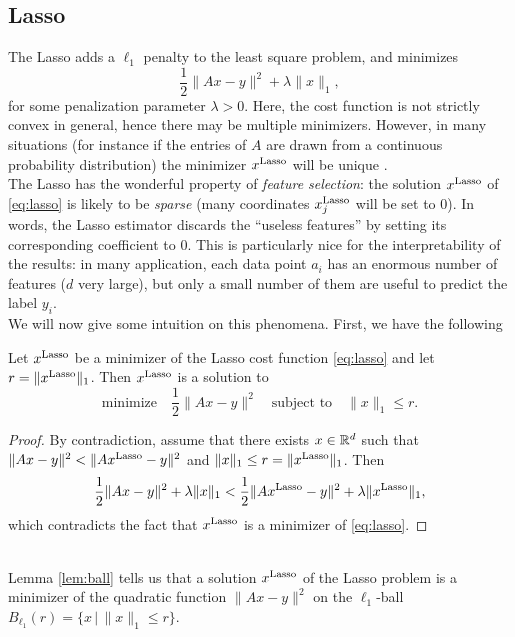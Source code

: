 \documentclass[11pt,nocut]{article}
\begin{document}
\subsection{Lasso}

The Lasso adds a $\ell_1$ penalty to the least square problem, and minimizes
\begin{equation}\label{eq:lasso}
\frac{1}{2} \| Ax - y \|^2 + \lambda \|x\|_1,
\end{equation}
for some penalization parameter $\lambda >0$.
Here, the cost function is not strictly convex in general, hence there may be multiple minimizers. However, in many situations (for instance if the entries of $A$ are drawn from a continuous probability distribution) the minimizer $x^{\rm Lasso}$ will be unique \cite{tibshirani2013lasso}.
\\

The Lasso has the wonderful property of \emph{feature selection}: the solution $x^{\rm Lasso}$ of \eqref{eq:lasso} is likely to be \emph{sparse} (many coordinates $x^{\rm Lasso}_j$ will be set to $0$).
In words, the Lasso estimator discards the ``useless features'' by setting its corresponding coefficient to $0$. 
This is particularly nice for the interpretability of the results: in many application, each data point $a_i$ has an enormous number of features ($d$ very large), but only a small number of them are useful to predict the label $y_i$.
\\

We will now give some intuition on this phenomena. First, we have the following

\begin{lemma}\label{lem:ball}
	Let $x^{\rm Lasso}$ be a minimizer of the Lasso cost function \eqref{eq:lasso} and let $r=\|x^{\rm Lasso}\|_1$. Then $x^{\rm Lasso}$ is a solution to
	$$
	\text{minimize} \quad \frac{1}{2} \|Ax-y\|^2 \quad
	\text{subject to} \quad \|x\|_1 \leq r.
	$$
\end{lemma}
\begin{proof}
	By contradiction, assume that there exists $x \in \mathbb{R}^d$ such that $\|Ax -y\|^2 < \|Ax^{\rm Lasso}-y\|^2$ and $\|x\|_1 \leq r = \|x^{\rm Lasso}\|_1$. Then
	$$
\frac{1}{2} \| Ax - y \|^2 + \lambda \|x\|_1 
< 
\frac{1}{2} \| Ax^{\rm Lasso} - y \|^2 + \lambda \|x^{\rm Lasso}\|_1,
$$
which contradicts the fact that $x^{\rm Lasso}$ is a minimizer of \eqref{eq:lasso}.
\end{proof}
\\

Lemma \ref{lem:ball} tells us that a solution $x^{\rm Lasso}$ of the Lasso problem is a minimizer of the quadratic function $\|Ax-y\|^2$ on the $\ell_1$-ball $B_{\ell_1}(r) = \{x \, | \, \|x\|_1 \leq r\}$.
\end{document}
